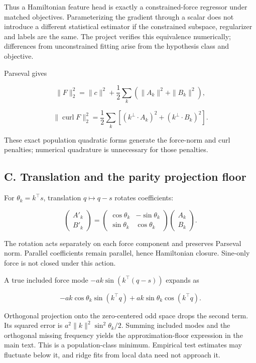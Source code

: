 \documentclass[
  10pt,
]{article}
\begin{document}
Thus a Hamiltonian feature head is exactly a constrained-force regressor
under matched objectives. Parameterizing the gradient through a scalar
does not introduce a different statistical estimator if the constrained
subspace, regularizer and labels are the same. The project verifies this
equivalence numerically; differences from unconstrained fitting arise
from the hypothesis class and objective.

Parseval gives

\[\|F\|_2^2=\|c\|^2+\frac12\sum_k(\|A_k\|^2+\|B_k\|^2),\]

\[\|\operatorname{curl}F\|_2^2=\frac12\sum_k[(k^\perp\!\cdot A_k)^2+(k^\perp\!\cdot B_k)^2].\]

These exact population quadratic forms generate the force-norm and curl
penalties; numerical quadrature is unnecessary for those penalties.

\hypertarget{c.-translation-and-the-parity-projection-floor}{%
\subsection*{C. Translation and the parity projection
floor}\label{c.-translation-and-the-parity-projection-floor}}

For \(\theta_k=k^\top s\), translation \(q\mapsto q-s\) rotates
coefficients:

\[\begin{pmatrix}A'_k\\B'_k\end{pmatrix}=
\begin{pmatrix}\cos\theta_k&-\sin\theta_k\\\sin\theta_k&\cos\theta_k\end{pmatrix}
\begin{pmatrix}A_k\\B_k\end{pmatrix}.\]

The rotation acts separately on each force component and preserves
Parseval norm. Parallel coefficients remain parallel, hence Hamiltonian
closure. Sine-only force is not closed under this action.

A true included force mode \(-a k\sin(k^\top(q-s))\) expands as

\[-a k\cos\theta_k\sin(k^\top q)+a k\sin\theta_k\cos(k^\top q).\]

Orthogonal projection onto the zero-centered odd space drops the second
term. Its squared error is \(a^2\|k\|^2\sin^2\theta_k/2\). Summing
included modes and the orthogonal missing frequency yields the
approximation-floor expression in the main text. This is a
population-class minimum. Empirical test estimates may fluctuate below
it, and ridge fits from local data need not approach it.
\end{document}
